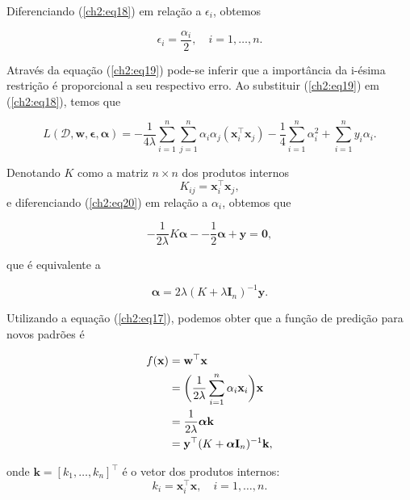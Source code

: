\noindent Diferenciando (\ref{ch2:eq18}) em relação a $\epsilon_i$, obtemos

\begin{equation}
    \label{ch2:eq19}
    \epsilon_i = \frac{\alpha_i}{2}, \quad i=1,\ldots,n.
\end{equation}

\noindent Através da equação (\ref{ch2:eq19}) pode-se inferir que a importância da i-ésima restrição é proporcional a seu respectivo erro. Ao substituir (\ref{ch2:eq19}) em (\ref{ch2:eq18}), temos que

\begin{equation}
    \label{ch2:eq20}
    L(\mathcal{D}, \mathbf{w}, \boldsymbol{\epsilon}, \boldsymbol{\alpha}) = -\frac{1}{4\lambda} \sum_{i=1}^{n} \sum_{j=1}^{n} \alpha_i \alpha_j (\mathbf{x}_i^{\top} \mathbf{x}_j) -\frac{1}{4} \sum_{i=1}^{n} \alpha_i^2 + \sum_{i=1}^{n} y_i \alpha_i.
\end{equation}

\noindent Denotando $K$ como a matriz $n \times n$ dos produtos internos \[ K_{ij} = \mathbf{x}_i^{\top}\mathbf{x}_j, \] e diferenciando (\ref{ch2:eq20}) em relação a $\alpha_i$, obtemos que

\begin{equation}
    \label{ch2:eq21}
    -\frac{1}{2\lambda} K\boldsymbol{\alpha} - -\frac{1}{2} \boldsymbol{\alpha} + \mathbf{y} = \mathbf{0},
\end{equation}

\noindent que é equivalente a 

\begin{equation}
    \label{ch2:eq22}
    \boldsymbol{\alpha} = 2\lambda(K + \lambda\mathbf{I}_n)^{-1}\mathbf{y}.
\end{equation}

\noindent Utilizando a equação (\ref{ch2:eq17}), podemos obter que a função de predição para novos padrões é

\begin{align}
    \label{ch2:eq23}
    f(\mathbf{x}) 
    &= \mathbf{w}^{\top}\mathbf{x} \notag \\
    &= \bigg{(} \frac{1}{2\lambda} \sum_{i=1}^{n} \alpha_i \mathbf{x}_i \bigg{)} \mathbf{x} \notag \\
    &= \frac{1}{2\lambda} \boldsymbol{\alpha} \mathbf{k} \notag \\
    &= \mathbf{y}^{\top}(K + \boldsymbol{\alpha}\mathbf{I}_n)^{-1}\mathbf{k},
\end{align}

\noindent onde $\mathbf{k} = [k_1,\ldots,k_n]^{\top}$ é o vetor dos produtos internos: \[ k_i = \mathbf{x}_i^{\top}\mathbf{x}, \quad i = 1,\ldots,n. \]

